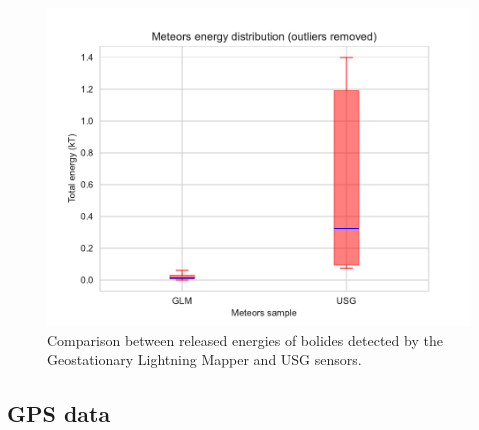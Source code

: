 \begin{figure}
  \centering
  \includegraphics[width=\linewidth]{./figures/energies_boxplot}
  \caption{Comparison between released energies of bolides detected by the Geostationary Lightning Mapper and USG sensors.}
  \label{fig:boxplot}
\end{figure}


\subsection{GPS data}
\label{ssec:GPS}


